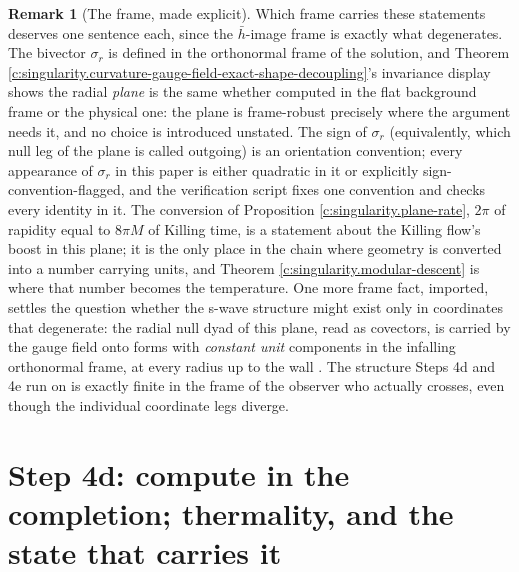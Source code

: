 \documentclass[11pt]{article}
\theoremstyle{definition}
\newtheorem{remark}[theorem]{Remark}
\theoremstyle{plain}
\providecommand{\hb}{}\renewcommand{\hb}{\bar{h}}
\begin{document}
\begin{remark}[The frame, made explicit]\label{c:note.singularity.frame-made-explicit}
Which frame carries these statements deserves one sentence each, since the $\hb$-image frame is exactly what degenerates. The bivector $\sigma_r$ is defined in the orthonormal frame of the solution, and Theorem \ref{c:singularity.curvature-gauge-field-exact-shape-decoupling}'s invariance display shows the radial \emph{plane} is the same whether computed in the flat background frame or the physical one: the plane is frame-robust precisely where the argument needs it, and no choice is introduced unstated. The sign of $\sigma_r$ (equivalently, which null leg of the plane is called outgoing) is an orientation convention; every appearance of $\sigma_r$ in this paper is either quadratic in it or explicitly sign-convention-flagged, and the verification script fixes one convention and checks every identity in it. The conversion of Proposition \ref{c:singularity.plane-rate}, $2\pi$ of rapidity equal to $8\pi M$ of Killing time, is a statement about the Killing flow's boost in this plane; it is the only place in the chain where geometry is converted into a number carrying units, and Theorem \ref{c:singularity.modular-descent} is where that number becomes the temperature. One more frame fact, imported, settles the question whether the s-wave structure might exist only in coordinates that degenerate: the radial null dyad of this plane, read as covectors, is carried by the gauge field onto forms with \emph{constant unit} components in the infalling orthonormal frame, at every radius up to the wall \cite[Prop.~8.23, Rem.~8.24]{ButlerT4}.
The structure Steps 4d and 4e run on is exactly finite in the frame of the observer who actually crosses, even though the individual coordinate legs diverge.
\end{remark}

\section{Step 4d: compute in the completion; thermality, and the state that carries it}
\end{document}
